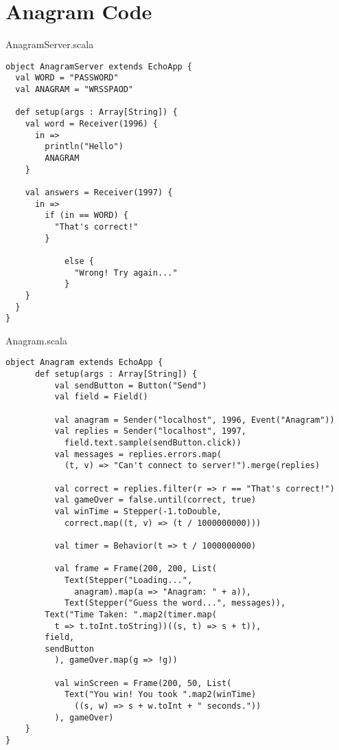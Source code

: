\chapter{Anagram Code}

AnagramServer.scala

\begin{verbatim}
object AnagramServer extends EchoApp {
  val WORD = "PASSWORD"
  val ANAGRAM = "WRSSPAOD"

  def setup(args : Array[String]) {	
    val word = Receiver(1996) {
      in =>
        println("Hello")
        ANAGRAM
    }

  	val answers = Receiver(1997) {
  	  in =>
  	    if (in == WORD) {
  	      "That's correct!"
  	    }

  			else {
  			  "Wrong! Try again..."
  			}
  	}
  }
}
\end{verbatim}

Anagram.scala

\begin{verbatim}
object Anagram extends EchoApp {
	  def setup(args : Array[String]) {
		  val sendButton = Button("Send")
		  val field = Field()
		  
		  val anagram = Sender("localhost", 1996, Event("Anagram"))
		  val replies = Sender("localhost", 1997, 
		    field.text.sample(sendButton.click))
		  val messages = replies.errors.map(
		    (t, v) => "Can't connect to server!").merge(replies)

		  val correct = replies.filter(r => r == "That's correct!")
		  val gameOver = false.until(correct, true)
		  val winTime = Stepper(-1.toDouble, 
		    correct.map((t, v) => (t / 1000000000)))

		  val timer = Behavior(t => t / 1000000000)

		  val frame = Frame(200, 200, List(
		    Text(Stepper("Loading...", 
		      anagram).map(a => "Anagram: " + a)),
		    Text(Stepper("Guess the word...", messages)),
        Text("Time Taken: ".map2(timer.map(
          t => t.toInt.toString))((s, t) => s + t)),
        field,
        sendButton
		  ), gameOver.map(g => !g))

		  val winScreen = Frame(200, 50, List(
		    Text("You win! You took ".map2(winTime)
		      ((s, w) => s + w.toInt + " seconds."))
		  ), gameOver)
	}
}
\end{verbatim}